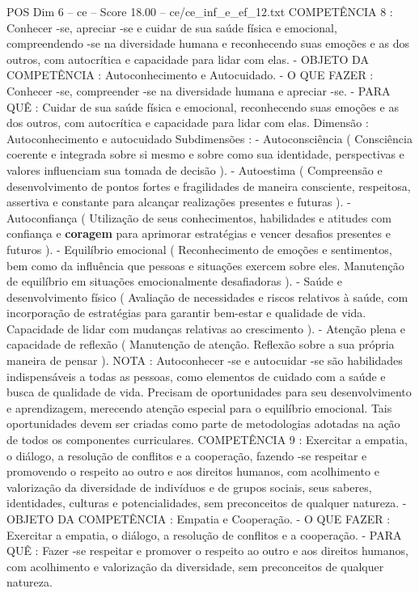 \begin{textsample}{POS Dim 6 – ce – Score 18.00 – ce/ce\_inf\_e\_ef\_12.txt}
COMPETÊNCIA 8 : Conhecer -se, apreciar -se e cuidar de sua saúde física e emocional, compreendendo -se na diversidade humana e reconhecendo suas emoções e as dos outros, com autocrítica e capacidade para lidar com elas. - OBJETO DA COMPETÊNCIA : Autoconhecimento e Autocuidado. - O QUE FAZER : Conhecer -se, compreender -se na diversidade humana e apreciar -se. - PARA QUÊ : Cuidar de sua saúde física e emocional, reconhecendo suas emoções e as dos outros, com autocrítica e capacidade para lidar com elas.
Dimensão : Autoconhecimento e autocuidado Subdimensões : - Autoconsciência ( Consciência coerente e integrada sobre si mesmo e sobre como sua identidade, perspectivas e valores influenciam sua tomada de decisão ). - Autoestima ( Compreensão e desenvolvimento de pontos fortes e fragilidades de maneira consciente, respeitosa, assertiva e constante para alcançar realizações presentes e futuras ). - Autoconfiança ( Utilização de seus conhecimentos, habilidades e atitudes com confiança e \textbf{coragem} para aprimorar estratégias e vencer desafios presentes e futuros ). - Equilíbrio emocional ( Reconhecimento de emoções e sentimentos, bem como da influência que pessoas e situações exercem sobre eles.
Manutenção de equilíbrio em situações emocionalmente desafiadoras ). - Saúde e desenvolvimento físico ( Avaliação de necessidades e riscos relativos à saúde, com incorporação de estratégias para garantir bem-estar e qualidade de vida.
Capacidade de lidar com mudanças relativas ao crescimento ). - Atenção plena e capacidade de reflexão ( Manutenção de atenção.
Reflexão sobre a sua própria maneira de pensar ).
NOTA : Autoconhecer -se e autocuidar -se são habilidades indispensáveis a todas as pessoas, como elementos de cuidado com a saúde e busca de qualidade de vida.
Precisam de oportunidades para seu desenvolvimento e aprendizagem, merecendo atenção especial para o equilíbrio emocional.
Tais oportunidades devem ser criadas como parte de metodologias adotadas na ação de todos os componentes curriculares.
COMPETÊNCIA 9 : Exercitar a empatia, o diálogo, a resolução de conflitos e a cooperação, fazendo -se respeitar e promovendo o respeito ao outro e aos direitos humanos, com acolhimento e valorização da diversidade de indivíduos e de grupos sociais, seus saberes, identidades, culturas e potencialidades, sem preconceitos de qualquer natureza. - OBJETO DA COMPETÊNCIA : Empatia e Cooperação. - O QUE FAZER : Exercitar a empatia, o diálogo, a resolução de conflitos e a cooperação. - PARA QUÊ : Fazer -se respeitar e promover o respeito ao outro e aos direitos humanos, com acolhimento e valorização da diversidade, sem preconceitos de qualquer natureza.

\end{textsample}

